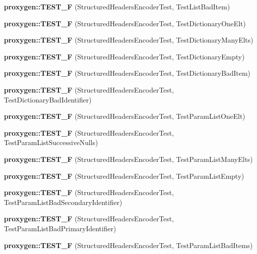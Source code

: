 \begin{DoxyCompactItemize}
{\bf proxygen\+::\+T\+E\+S\+T\+\_\+F} (Structured\+Headers\+Encoder\+Test, Test\+List\+Bad\+Item)
\item 
{\bf proxygen\+::\+T\+E\+S\+T\+\_\+F} (Structured\+Headers\+Encoder\+Test, Test\+Dictionary\+One\+Elt)
\item 
{\bf proxygen\+::\+T\+E\+S\+T\+\_\+F} (Structured\+Headers\+Encoder\+Test, Test\+Dictionary\+Many\+Elts)
\item 
{\bf proxygen\+::\+T\+E\+S\+T\+\_\+F} (Structured\+Headers\+Encoder\+Test, Test\+Dictionary\+Empty)
\item 
{\bf proxygen\+::\+T\+E\+S\+T\+\_\+F} (Structured\+Headers\+Encoder\+Test, Test\+Dictionary\+Bad\+Item)
\item 
{\bf proxygen\+::\+T\+E\+S\+T\+\_\+F} (Structured\+Headers\+Encoder\+Test, Test\+Dictionary\+Bad\+Identifier)
\item 
{\bf proxygen\+::\+T\+E\+S\+T\+\_\+F} (Structured\+Headers\+Encoder\+Test, Test\+Param\+List\+One\+Elt)
\item 
{\bf proxygen\+::\+T\+E\+S\+T\+\_\+F} (Structured\+Headers\+Encoder\+Test, Test\+Param\+List\+Successive\+Nulls)
\item 
{\bf proxygen\+::\+T\+E\+S\+T\+\_\+F} (Structured\+Headers\+Encoder\+Test, Test\+Param\+List\+Many\+Elts)
\item 
{\bf proxygen\+::\+T\+E\+S\+T\+\_\+F} (Structured\+Headers\+Encoder\+Test, Test\+Param\+List\+Empty)
\item 
{\bf proxygen\+::\+T\+E\+S\+T\+\_\+F} (Structured\+Headers\+Encoder\+Test, Test\+Param\+List\+Bad\+Secondary\+Identifier)
\item 
{\bf proxygen\+::\+T\+E\+S\+T\+\_\+F} (Structured\+Headers\+Encoder\+Test, Test\+Param\+List\+Bad\+Primary\+Identifier)
\item 
{\bf proxygen\+::\+T\+E\+S\+T\+\_\+F} (Structured\+Headers\+Encoder\+Test, Test\+Param\+List\+Bad\+Items)
\end{DoxyCompactItemize}
